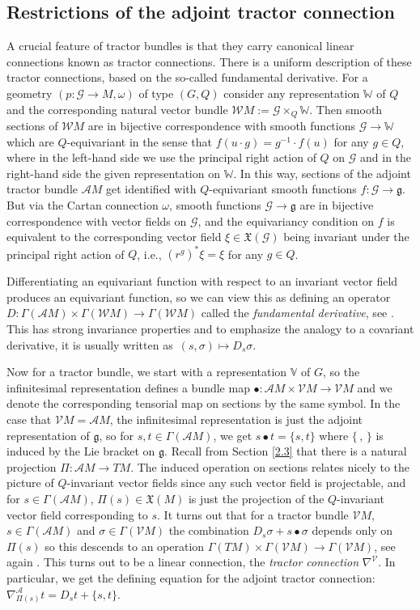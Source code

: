 \documentclass[pdftex]{sigma}
\numberwithin{equation}{section}
\def\frak{\mathfrak}
\def\Bbb{\mathbb}
\def\Cal{\mathcal}
\newcommand{\x}{\times}
\newcommand{\om}{\omega}
\newcommand{\si}{\sigma}
\newcommand{\Ga}{\Gamma}
\begin{document}
\subsection{Restrictions of the adjoint tractor connection}\label{3.1}
A crucial feature of tractor bundles is that they carry canonical linear connections
known as tractor connections. There is a uniform description of these tractor
connections, based on the so-called fundamental derivative. For a geometry $(p\colon \Cal
G\to M,\om)$ of type $(G,Q)$ consider any representation $\Bbb W$ of $Q$ and the
corresponding natural vector bundle $\Cal WM:=\Cal G\x_Q\Bbb W$. Then smooth sections
of $\Cal WM$ are in bijective correspondence with smooth functions $\Cal G\to\Bbb W$
which are $Q$-equivariant in the sense that $f(u\cdot g)=g^{-1}\cdot f(u)$ for any
$g\in Q$, where in the left-hand side we use the principal right action of $Q$ on
$\Cal G$ and in the right-hand side the given representation on $\mathbb{W}$. In this way,
sections of the adjoint tractor bundle $\Cal AM$ get identified with $Q$-equivariant
smooth functions $f\colon \Cal G\to\frak g$. But via the Cartan connection $\om$, smooth
functions $\Cal G\to\frak g$ are in bijective correspondence with vector fields on
$\Cal G$, and the equivariancy condition on $f$ is equivalent to the corresponding
vector field $\xi\in\frak X(\Cal G)$ being invariant under the principal right action
of $Q$, i.e., $(r^g)^*\xi=\xi$ for any $g\in Q$.

Differentiating an equivariant function with respect to an invariant vector field
produces an equivariant function, so we can view this as defining an operator
$D\colon \Gamma(\Cal AM)\x \Ga(\Cal WM)\to\Ga(\Cal WM)$ called the \textit{fundamental
 derivative}, see \cite[Section 1.5.8]{book}. This has strong invariance
properties and to emphasize the analogy to a covariant derivative, it is usually
written as~${(s,\si)\!\mapsto\! D_s\si}$.

Now for a tractor bundle, we start with a representation $\Bbb V$ of $G$, so the
infinitesimal representation defines a bundle map $\bullet\colon \Cal AM\x\Cal VM\to\Cal
VM$ and we denote the corresponding tensorial map on sections by the same symbol. In
the case that $\Cal VM=\Cal AM$, the infinitesimal representation is just the adjoint
representation of $\frak g$, so for $s,t\in\Ga(\Cal AM)$, we get $s\bullet t=\{s,t\}$
where $\{\, ,\, \}$ is induced by the Lie bracket on $\frak g$. Recall from Section
\ref{2.3} that there is a natural projection $\Pi\colon \Cal AM\to TM$. The induced
operation on sections relates nicely to the picture of $Q$-invariant vector fields
since any such vector field is projectable, and for $s\in\Ga(\Cal AM)$,
$\Pi(s)\in\frak X(M)$ is just the projection of the $Q$-invariant vector field
corresponding to $s$. It turns out that for a tractor bundle $\Cal VM$, $s\in\Ga(\Cal
AM)$ and $\si\in\Ga(\Cal VM)$ the combination $D_s\si+s\bullet\si$ depends only on
$\Pi(s)$ so this descends to an operation $\Ga(TM)\x\Ga(\Cal VM)\to\Ga(\Cal VM)$, see
again \cite[Section 1.5.8]{book}. This turns out to be a linear connection, the
\textit{tractor connection} $\nabla^{\Cal V}$. In particular, we get the defining
equation for the adjoint tractor connection: $\nabla^{\Cal
 A}_{\Pi(s)}t=D_st+\{s,t\}$.
\end{document}

